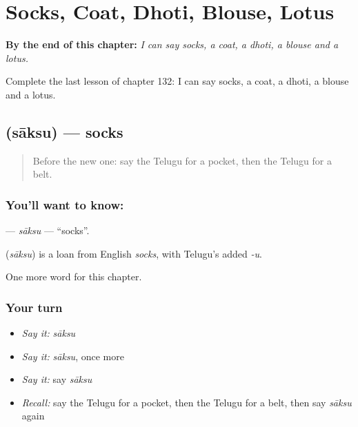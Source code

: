 
\chapter{Socks, Coat, Dhoti, Blouse, Lotus}
\label{ch:te-socks-coat-dhoti-blouse-lotus}

\begin{chapteropening}
\textbf{By the end of this chapter:} \emph{I can say socks, a coat, a dhoti, a blouse and a lotus.}

Complete the last lesson of chapter 132: I can say socks, a coat, a dhoti, a blouse and a lotus.
\end{chapteropening}

\section[\texorpdfstring{\te{సాక్సు} (sāksu)}{సాక్సు (sāksu)}]{ (sāksu) — socks}

\label{lesson:TE-C132-saksu}



\begin{quote}
Before the new one: say the Telugu for a pocket, then the Telugu for a belt.
\end{quote}

\subsection*{You'll want to know: }
\textbf{} — \emph{sāksu} — \textquotedblleft{}socks\textquotedblright{}.

\begin{cousinweb}
\textbf{} (\emph{sāksu}) is a loan from English \emph{socks}, with Telugu's added \emph{-u}.
\end{cousinweb}

\begin{grammarlens}[title={What you've built}]
One more word for this chapter.
\end{grammarlens}

\subsection*{Your turn}
\begin{itemize}
\raggedright
  \item \emph{Say it:} \emph{sāksu}
  \item \emph{Say it:} \emph{sāksu}, once more
  \item \emph{Say it:} say \emph{sāksu}
  \item \emph{Recall:} say the Telugu for a pocket, then the Telugu for a belt, then say \emph{sāksu} again
\end{itemize}

